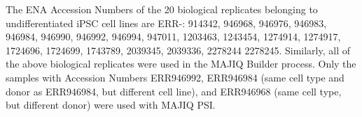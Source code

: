 The ENA Accession Numbers of the 20 biological replicates belonging to undifferentiated iPSC cell lines \cite{hipsci} are ERR-: 
914342, 946968, 946976, 946983, 946984, 946990, 946992, 946994, 947011, 1203463, 1243454, 1274914, 1274917, 1724696, 1724699, 1743789, 2039345, 2039336, 2278244 2278245.
Similarly, all of the above biological replicates were used in the MAJIQ Builder process. Only the samples with Accession Numbers ERR946992, ERR946984 (same cell type and donor as ERR946984, but different cell line), and ERR946968 (same cell type, but different donor) were used with MAJIQ PSI. 
%
%
%
%
%
%
%
%

%
%
%
%
%
%
%
%
%

